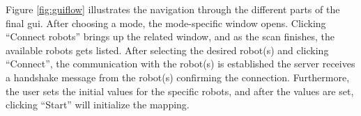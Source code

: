 Figure \ref{fig:guiflow} illustrates the navigation through the different parts of the final \acrshort{gui}. After choosing a mode, the mode-specific window opens. Clicking ``Connect robots'' brings up the related window, and as the scan finishes, the available robots gets listed. After selecting the desired robot(s) and clicking ``Connect'', the communication with the robot(s) is established the server receives a handshake message from the robot(s) confirming the connection. Furthermore, the user sets the initial values for the specific robots, and after the values are set, clicking ``Start'' will initialize the mapping.


